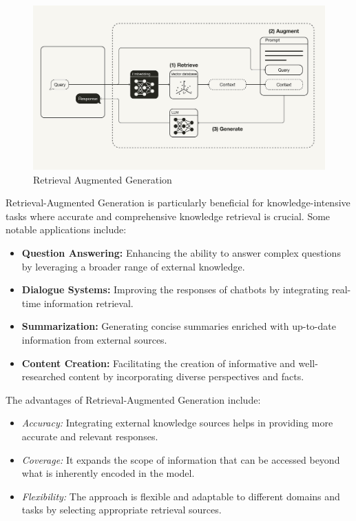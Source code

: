 \begin{figure}[h!]
	\centering
	\includegraphics[scale=0.3]{figures/Rag.png}
	\caption{ Retrieval Augmented Generation }
\end{figure}

\newpage

Retrieval-Augmented Generation is particularly beneficial for knowledge-intensive tasks where accurate and comprehensive knowledge retrieval is crucial. Some notable applications include:



\begin{itemize}
    \item \textbf{Question Answering:} Enhancing the ability to answer complex questions by leveraging a broader range of external knowledge.
    \item \textbf{Dialogue Systems:} Improving the responses of chatbots by integrating real-time information retrieval.
    \item \textbf{Summarization:} Generating concise summaries enriched with up-to-date information from external sources.
    \item \textbf{Content Creation:} Facilitating the creation of informative and well-researched content by incorporating diverse perspectives and facts.
\end{itemize}


\hfill \break
The advantages of Retrieval-Augmented Generation include:
\begin{itemize}
    \item \textit{Accuracy:} Integrating external knowledge sources helps in providing more accurate and relevant responses.
    \item \textit{Coverage:} It expands the scope of information that can be accessed beyond what is inherently encoded in the model.
    \item \textit{Flexibility:} The approach is flexible and adaptable to different domains and tasks by selecting appropriate retrieval sources.
\end{itemize}

